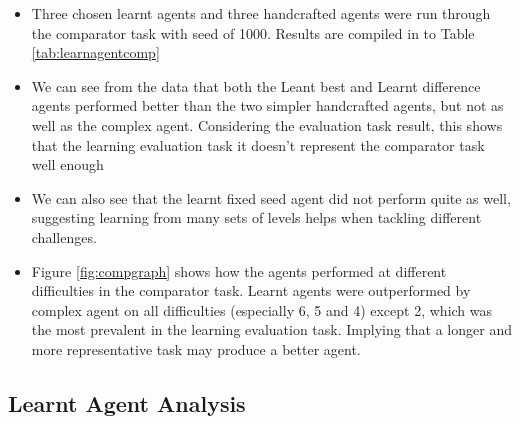 \begin{itemize}
\item Three chosen learnt agents and three handcrafted agents were run through the comparator task with seed of 1000. Results are compiled in to Table \ref{tab:learnagentcomp}
\item We can see from the data that both the Leant best and Learnt difference agents performed better than the two simpler handcrafted agents, but not as well as the complex agent. Considering the evaluation task result, this shows that the learning evaluation task it doesn't represent the comparator task well enough
\item We can also see that the learnt fixed seed agent did not perform quite as well, suggesting learning from many sets of levels helps when tackling different challenges.
\item Figure \ref{fig:compgraph} shows how the agents performed at different difficulties in the comparator task. Learnt agents were outperformed by complex agent on all difficulties (especially 6, 5 and 4) except 2, which was the most prevalent in the learning evaluation task. Implying that a longer and more representative task may produce a better agent.
\end{itemize}

\clearpage
\subsection{Learnt Agent Analysis}
\label{subsec:evallearn2}

